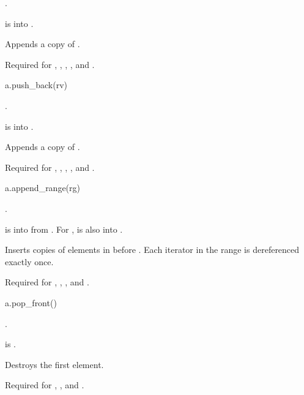 \begin{itemdescr}
\pnum
\result
{}.

\pnum
\expects
{} is  into .

\pnum
\effects
Appends a copy of .

\pnum
\remarks
Required for
,
,
,
, and
.
\end{itemdescr}

\begin{itemdecl}
a.push_back(rv)
\end{itemdecl}

\begin{itemdescr}
\pnum
\result
{}.

\pnum
\expects
{} is  into .

\pnum
\effects
Appends a copy of .

\pnum
\remarks
Required for
,
,
,
, and
.
\end{itemdescr}

\begin{itemdecl}
a.append_range(rg)
\end{itemdecl}

\begin{itemdescr}
\pnum
\result
{}.

\pnum
\expects
{} is  into 
from .
For ,
 is also
 into .

\pnum
\effects
Inserts copies of elements in  before .
Each iterator in the range  is dereferenced exactly once.

\pnum
\remarks
Required for
,
,
, and
.
\end{itemdescr}

\begin{itemdecl}
a.pop_front()
\end{itemdecl}

\begin{itemdescr}
\pnum
\result
{}.

\pnum
\hardexpects
{} is .

\pnum
\effects
Destroys the first element.

\pnum
\remarks
Required for
,
, and
.
\end{itemdescr}

